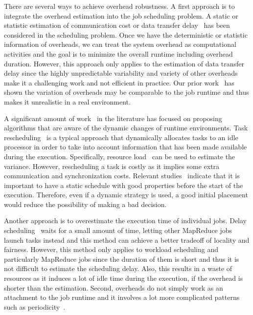 \documentclass[final,5p,times,twocolumn]{elsarticle}
\begin{document}
There are several ways to achieve overhead robustness. A first approach is to integrate the overhead estimation into the job scheduling problem. A static or statistic estimation of communication cost or data transfer delay~\cite{Dong2010, Yang03} has been considered in the scheduling problem. Once we have the deterministic or statistic information of overheads, we can treat the system overhead as computational activities and the goal is to minimize the overall runtime including overhead duration. However, this approach only applies to the estimation of data transfer delay since the highly unpredictable variability and variety of other overheads make it a challenging work and not efficient in practice. Our prior work~\cite{Chen} has shown the variation of overheads may be comparable to the job runtime and thus makes it unrealistic in a real environment.  

A significant amount of work~\cite{Ahmad1998, Chetto1990, Dong2010, Yang03} in the literature has focused on proposing algorithms that are aware of the dynamic changes of runtime environments. Task rescheduling~\cite{Sakellariou2004, Zhang2009, Chen2010} is a typical approach that dynamically allocates tasks to an idle processor in order to take into account information that has been made available during the execution. Specifically, resource load~\cite{Dong2010} can be used to estimate the variance. However, rescheduling a task is costly as it implies some extra communication and synchronization costs. Relevant studies~\cite{Sakellariou2004} indicate that it is important to have a static schedule with good properties before the start of the execution. Therefore, even if a dynamic strategy is used, a good initial placement would reduce the possibility of making a bad decision. 

Another approach is to overestimate the execution time of individual jobs. Delay scheduling~\cite{Zaharia10} waits for a small amount of time, letting other MapReduce jobs launch tasks instead and this method can achieve a better tradeoff of locality and fairness. However, this method only applies to workload scheduling and particularly MapReduce jobs since the duration of them is short and thus it is not difficult to estimate the scheduling delay. Also, this results in a waste of resources as it induces a lot of idle time during the execution, if the overhead is shorter than the estimation. Second, overheads do not simply work as an attachment to the job runtime and it involves a lot more complicated patterns such as periodicity~\cite{Chen}. 
\end{document}
